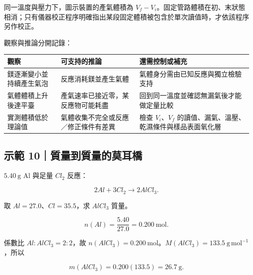 \documentclass[11pt,a4paper]{article}
\newcounter{none}
\begin{document}
同一溫度與壓力下，圖示裝置的產氣體積為 \(V_f-V_i\)。固定管路體積在初、末狀態相消；只有儀器校正程序明確指出某段固定體積被包含於單次讀值時，才依該程序另作校正。

觀察與推論分開記錄：

{\def\LTcaptype{none} %
\begin{longtable}[]{@{}
  >{\raggedright\arraybackslash}p{}
  >{\raggedright\arraybackslash}p{}
  >{\raggedright\arraybackslash}p{}@{}}
\toprule\noalign{}
\begin{minipage}[b]{\linewidth}\raggedright
觀察
\end{minipage} & \begin{minipage}[b]{\linewidth}\raggedright
可支持的推論
\end{minipage} & \begin{minipage}[b]{\linewidth}\raggedright
還需控制或補充
\end{minipage} \\
\midrule\noalign{}
\endhead
\bottomrule\noalign{}
\endlastfoot
鎂逐漸變小並持續產生氣泡 & 反應消耗鎂並產生氣體 & 氣體身分需由已知反應與獨立檢驗支持 \\
氣體體積上升後達平臺 & 產氣速率已接近零，某反應物可能耗盡 & 回到同一溫度並確認無漏氣後才能做定量比較 \\
實測體積低於理論值 & 氣體收集不完全或反應／修正條件有差異 & 檢查 \(V_i\)、\(V_f\) 的讀值、漏氣、溫壓、乾濕條件與樣品表面氧化層 \\
\end{longtable}
}

\begin{HandoutWorkedExample}

\subsection{示範 10｜質量到質量的莫耳橋}\label{ux793aux7bc4-10ux8ceaux91cfux5230ux8ceaux91cfux7684ux83abux8033ux6a4b}

\(5.40\ \mathrm g\) Al 與足量 \(Cl_2\) 反應：

\[
2Al+3Cl_2\rightarrow2AlCl_3.
\]

取 \(Al=27.0\)、\(Cl=35.5\)，求 \(AlCl_3\) 質量。

\[
n(Al)=\frac{5.40}{27.0}=0.200\ \mathrm{mol}.
\]

係數比 \(Al:AlCl_3=2:2\)，故 \(n(AlCl_3)=0.200\ \mathrm{mol}\)。\(M(AlCl_3)=133.5\ \mathrm{g\,mol^{-1}}\)，所以

\[
m(AlCl_3)=0.200(133.5)=26.7\ \mathrm g.
\]

\end{HandoutWorkedExample}
\end{document}
